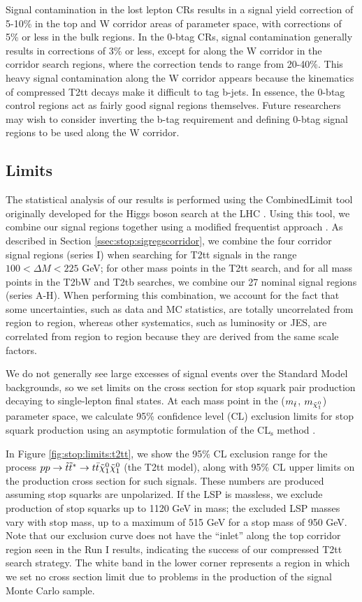 Signal contamination in the lost lepton CRs results in a signal yield
correction of 5-10\% in the top and W corridor areas of parameter
space, with corrections of 5\% or less in the bulk regions. In the
0-btag CRs, signal contamination generally results in corrections of
3\% or less, except for along the W corridor in the corridor search
regions, where the correction tends to range from 20-40\%. This heavy
signal contamination along the W corridor appears because the
kinematics of compressed T2tt decays make it difficult to tag
b-jets. In essence, the 0-btag control regions act as fairly good
signal regions themselves. Future researchers may wish to consider
inverting the b-tag requirement and defining 0-btag signal regions to
be used along the W corridor.

\subsection{Limits}
\label{ssec:stop:limits}

The statistical analysis of our results is performed using the
CombinedLimit tool originally developed for the Higgs boson search at
the LHC \cite{higgscombine}. Using this tool, we combine our
signal regions together using a modified frequentist approach
\cite{combineregions}. As described in Section
\ref{ssec:stop:sigregscorridor}, we combine the four corridor signal
regions (series I) when searching for T2tt signals in the range $100 < \Delta M <
225$ GeV; for other mass points in the T2tt search, and for all mass
points in the T2bW and T2tb searches, we combine our 27 nominal signal
regions (series A-H). When performing this combination, we account for
the fact that some uncertainties, such as data and MC statistics, are
totally uncorrelated from region to region, whereas other systematics,
such as luminosity or JES, are correlated from region to region
because they are derived from the same scale factors.

We do not generally see large excesses of signal events over the
Standard Model backgrounds, so we set limits on the cross section for
stop squark pair production decaying to single-lepton final states.
At each mass point in the ($m_{\tilde{t}}$, $m_{\tilde{\chi}^0_1}$) parameter space,
we calculate 95\% confidence level (CL) exclusion limits for stop squark
production using an asymptotic formulation of the
CL$_\text{s}$ method \cite{cls,asymptotic}.

In Figure \ref{fig:stop:limits:t2tt}, we show the 95\% CL exclusion
range for the process $pp \rightarrow \tilde{t}\tilde{t}^* \rightarrow
t\bar{t} \tilde{\chi}^0_1 \tilde{\chi}^0_1$ (the T2tt model), along with 95\% CL upper limits on
the production cross section for such signals. These numbers are
produced assuming stop squarks are unpolarized. If the LSP is
massless, we exclude production of stop squarks up to 1120 GeV in
mass; the excluded LSP masses vary with stop mass, up to a maximum of
515 GeV for a stop mass of 950 GeV. Note that our exclusion curve does
not have the ``inlet'' along the top corridor region seen in the Run I
results, indicating the success of our compressed T2tt search
strategy. The white band in the lower corner represents a region in
which we set no cross section limit due to problems in the
production of the signal Monte Carlo sample.

